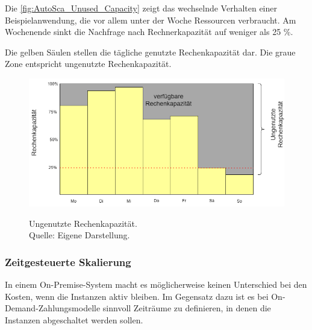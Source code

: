 Die \autoref{fig:AutoSca_Unused_Capacity} zeigt das wechselnde Verhalten einer Beispielanwendung, die vor allem unter der Woche Ressourcen verbraucht. Am Wochenende sinkt die Nachfrage nach Rechnerkapazität auf weniger als 25 \%. 

Die gelben Säulen stellen die tägliche genutzte Rechenkapazität dar.
Die graue Zone entspricht ungenutzte Rechenkapazität. 

\begin{figure}[h]
    \centering
    \includegraphics[scale=0.6]{sources/AutoCap Unused Capacity}
    \caption{}\label{fig:AutoSca_Unused_Capacity} Ungenutzte Rechenkapazität. \\
    Quelle: Eigene Darstellung. 
  \end{figure}


\subsubsection{Zeitgesteuerte Skalierung}
In einem On-Premise-System macht es möglicherweise keinen Unterschied bei den Kosten, wenn die Instanzen aktiv bleiben. 
Im Gegensatz dazu ist es bei On-Demand-Zahlungsmodelle sinnvoll Zeiträume zu definieren, in denen die Instanzen abgeschaltet werden sollen.

